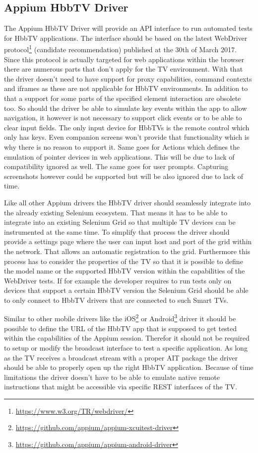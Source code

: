 \subsection{Appium HbbTV Driver}

The Appium HbbTV Driver will provide an API interface to run automated tests for HbbTV applications. The interface should be based on the latest WebDriver protocol\footnote{\url{https://www.w3.org/TR/webdriver/}} (candidate recommendation) published at the 30th of March 2017. Since this protocol is actually targeted for web applications within the browser there are numerous parts that don't apply for the TV environment. With that the driver doesn't need to have support for proxy capabilities, command contexts and iframes as these are not applicable for HbbTV environments. In addition to that a support for some parts of the specified element interaction are obsolete too. So should the driver be able to simulate key events within the app to allow navigation, it however is not necessary to support click events or to be able to clear input fields. The only input device for HbbTVs is the remote control which only has keys. Even companion screens won't provide that functionality which is why there is no reason to support it. Same goes for Actions which defines the emulation of pointer devices in web applications. This will be due to lack of compatibility ignored as well. The same goes for user prompts. Capturing screenshots however could be supported but will be also ignored due to lack of time.

Like all other Appium drivers the HbbTV driver should seamlessly integrate into the already existing Selenium ecosystem. That means it has to be able to integrate into an existing Selenium Grid so that multiple TV devices can be instrumented at the same time. To simplify that process the driver should provide a settings page where the user can input host and port of the grid within the network. That allows an automatic registration to the grid. Furthermore this process has to consider the properties of the TV so that it is possible to define the model name or the supported HbbTV version within the capabilities of the WebDriver tests. If for example the developer requires to run tests only on devices that support a certain HbbTV version the Selenium Grid should be able to only connect to HbbTV drivers that are connected to such Smart TVs.

Similar to other mobile drivers like the iOS\footnote{\url{https://github.com/appium/appium-xcuitest-driver}} or Android\footnote{\url{https://github.com/appium/appium-android-driver}} driver it should be possible to define the URL of the HbbTV app that is supposed to get tested within the capabilities of the Appium session. Therefor it should not be required to setup or modify the broadcast interface to test a specific application. As long as the TV receives a broadcast stream with a proper AIT package the driver should be able to properly open up the right HbbTV application. Because of time limitations the driver doesn't have to be able to emulate native remote instructions that might be accessible via specific REST interfaces of the TV.

